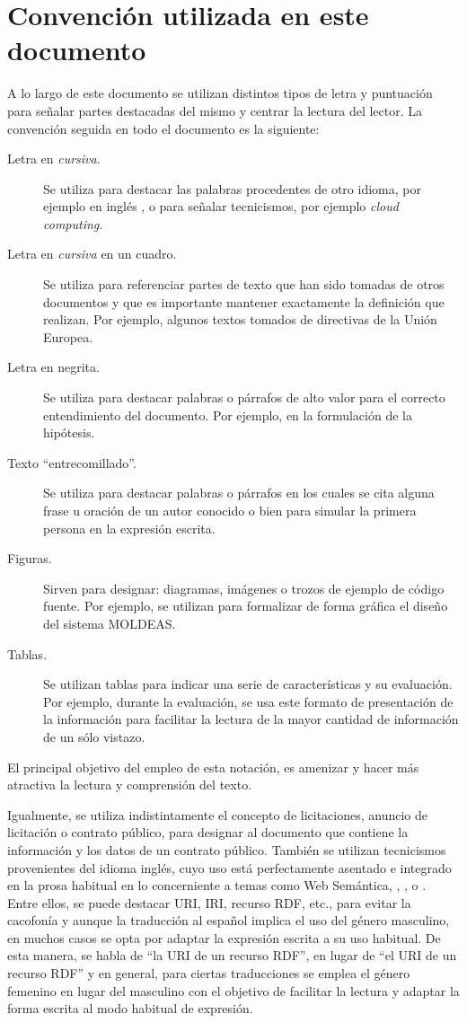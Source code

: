 \section{Convención utilizada en este documento}
A lo largo de este documento se utilizan distintos tipos de letra y puntuación para señalar partes destacadas
del mismo y centrar la lectura del lector. La convención seguida en todo el documento es la siguiente:
\begin{description}
 \item [Letra en \textit{cursiva}.] Se utiliza para destacar las palabras procedentes de otro idioma, por ejemplo en inglés \linkeddata, o para señalar
tecnicismos, por ejemplo \textit{cloud computing}.
 \item [Letra en \textit{cursiva} en un cuadro.] Se utiliza para referenciar partes de texto que han sido tomadas de otros documentos y que
es importante mantener exactamente la definición que realizan. Por ejemplo, algunos textos tomados de directivas de la Unión Europea.
\item [Letra en negrita.] Se utiliza para destacar palabras o párrafos de alto valor para el correcto entendimiento del documento. Por ejemplo,
en la formulación de la hipótesis.
\item [Texto ``entrecomillado''.] Se utiliza para destacar palabras o párrafos en los cuales se cita alguna frase u oración
de un autor conocido o bien para simular la primera persona en la expresión escrita.
\item [Figuras.] Sirven para designar: diagramas, imágenes o trozos de ejemplo de código fuente. Por ejemplo, se utilizan para formalizar
de forma gráfica el diseño del sistema \gls{MOLDEAS}.
\item [Tablas.] Se utilizan tablas para indicar una serie de características y su evaluación. Por ejemplo, durante la evaluación,
se usa este formato de presentación de la información para facilitar la lectura de la mayor cantidad de información de un sólo vistazo.
\end{description}

El principal objetivo del empleo de esta notación, es amenizar y hacer más atractiva
la lectura y comprensión del texto.

Igualmente, se utiliza indistintamente el concepto de licitaciones, anuncio de licitación o contrato público, para
designar al documento que contiene la información y los datos de un contrato público. También se utilizan tecnicismos 
provenientes del idioma inglés, cuyo uso está perfectamente asentado e integrado en la prosa habitual
en lo concerniente a temas como Web Semántica, \linkeddata, \opendata, \lod o \wod. Entre ellos, se puede destacar \gls{URI}, \gls{IRI},
recurso RDF, etc., para evitar la cacofonía y aunque la traducción al español implica el uso del género masculino, en 
muchos casos se opta por adaptar la expresión escrita a su uso habitual. De esta manera, se habla
de ``la URI de un recurso RDF'', en lugar de ``el URI de un recurso RDF'' y en general, para ciertas
traducciones se emplea el género femenino en lugar del masculino con el objetivo de facilitar la lectura
y adaptar la forma escrita al modo habitual de expresión.

